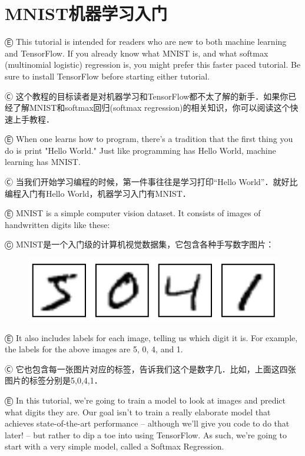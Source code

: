 


\newpage
\section {MNIST机器学习入门}\label{MINIST_beginner}

Ⓔ This tutorial is intended for readers who are new to both machine learning and TensorFlow. If you already know what MNIST is, and what softmax (multinomial logistic) regression is, you might prefer this faster paced tutorial. Be sure to install TensorFlow before starting either tutorial.

Ⓒ 这个教程的目标读者是对机器学习和TensorFlow都不太了解的新手．如果你已经了解MNIST和softmax回归(softmax regression)的相关知识，你可以阅读这个快速上手教程．

Ⓔ When one learns how to program, there's a tradition that the first thing you do is print "Hello World." Just like programming has Hello World, machine learning has MNIST.

Ⓒ 当我们开始学习编程的时候，第一件事往往是学习打印“Hello World”．就好比编程入门有Hello World，机器学习入门有MNIST．

Ⓔ MNIST is a simple computer vision dataset. It consists of images of handwritten digits like these:

Ⓒ MNIST是一个入门级的计算机视觉数据集，它包含各种手写数字图片：

\begin{figure}[htbp]
\centering
\includegraphics[width=.55\textwidth]{../SOURCE/images/MNIST.png}
\caption{}
\end{figure}

Ⓔ It also includes labels for each image, telling us which digit it is. For example, the labels for the above images are 5, 0, 4, and 1.

Ⓒ 它也包含每一张图片对应的标签，告诉我们这个是数字几．比如，上面这四张图片的标签分别是5,0,4,1．

Ⓔ In this tutorial, we're going to train a model to look at images and predict what digits they are. Our goal isn't to train a really elaborate model that achieves state-of-the-art performance -- although we'll give you code to do that later! -- but rather to dip a toe into using TensorFlow. As such, we're going to start with a very simple model, called a Softmax Regression.

